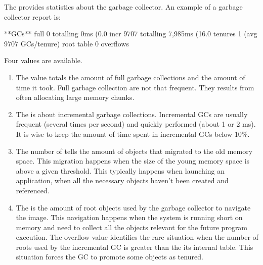 \documentclass[a4paper,10pt,twoside]{book}
\begin{document}
The  provides statistics about the garbage collector. An example of a garbage collector report is:

\begin{code}

**GCs**
	full			0 totalling 0ms (0.0%
	incr		9707 totalling 7,985ms (16.0%
	tenures		1 (avg 9707 GCs/tenure)
	root table	0 overflows
\end{code}

Four values are available.

\begin{enumerate}
\item The  value totals the amount of full garbage collections and the amount of time it took. Full garbage collection are not that frequent. They results from often allocating large memory chunks.

\item The  is about incremental garbage collections. Incremental GCs are usually frequent (several times per second) and quickly performed (about 1 or 2 ms). It is wise to keep the amount of time spent in incremental GCs below 10\%. 

\item The number of  tells the amount of objects that migrated to the old memory space. This migration happens when the size of the young memory space is above a given threshold. This typically happens when launching an application, when all the necessary objects haven't been created and referenced. 

\item The  is the amount of root objects used by the garbage collector to navigate the image. This navigation happens when the system is running short on memory and need to collect all the objects relevant for the future program execution. The overflow value identifies the rare situation when the number of roots used by the incremental GC is greater than the its internal table. This situation forces the GC to promote some objects as tenured.

\end{enumerate}
\end{document}
